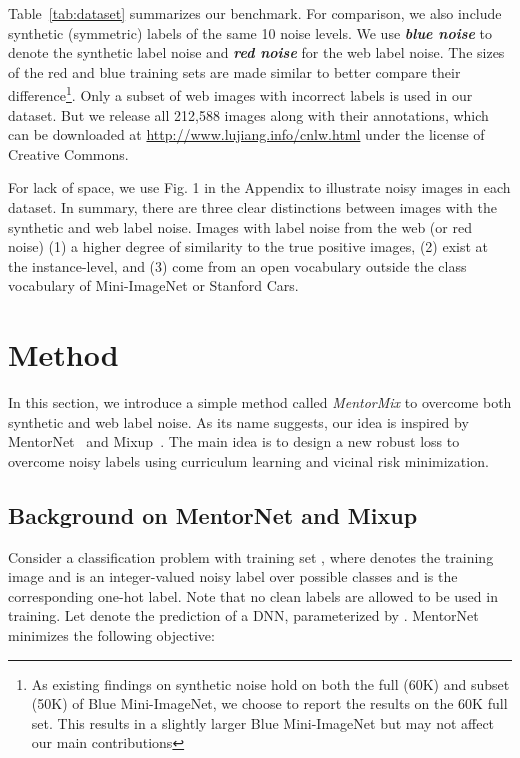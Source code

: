 \documentclass{article}
\begin{document}
Table~\ref{tab:dataset} summarizes our benchmark. For comparison, we also include synthetic (symmetric) labels of the same 10 noise levels. We use \textbf{\emph{blue noise}} to denote the synthetic label noise and \textbf{\emph{red noise}} for the web label noise. The sizes of the red and blue training sets are made similar to better compare their difference\footnote{As existing findings on synthetic noise hold on both the full (60K) and subset (50K) of Blue Mini-ImageNet, we choose to report the results on the 60K full set. This results in a slightly larger Blue Mini-ImageNet but may not affect our main contributions}. Only a subset of web images with incorrect labels is used in our dataset. But we release all 212,588 images along with their annotations, which can be downloaded at {\footnotesize \url{http://www.lujiang.info/cnlw.html}} under the license of Creative Commons.

For lack of space, we use Fig. 1 in the Appendix to illustrate noisy images in each dataset. In summary, there are three clear distinctions between images with the synthetic and web label noise. Images with label noise from the web (or red noise) (1) a higher degree of similarity to the true positive images, (2) exist at the instance-level, and (3) come from an open vocabulary outside the class vocabulary of Mini-ImageNet or Stanford Cars.

\section{Method}\label{sec:methods}
In this section, we introduce a simple method called \emph{MentorMix} to overcome both synthetic and web label noise. As its name suggests, our idea is inspired by MentorNet~\cite{jiang2018mentornet} and Mixup~\cite{zhang2018mixup}. The main idea is to design a new robust loss to overcome noisy labels using curriculum learning and vicinal risk minimization.

\subsection{Background on MentorNet and Mixup}

Consider a classification problem with training set , where  denotes the  training image and  is an integer-valued noisy label over  possible classes and  is the corresponding one-hot label. Note that no clean labels are allowed to be used in training.
Let  denote the prediction of a DNN, parameterized by . MentorNet~\citep{jiang2018mentornet} minimizes the following objective:
\end{document}
